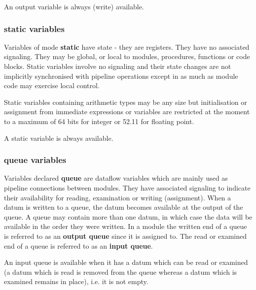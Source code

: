                 An output variable is always (write) available.

            \subsubsection{static variables}

                Variables of mode {\bf static} have state - they are registers.
                They have no associated signaling. They may be global, or local to
                modules, procedures, functions or code blocks. Static
                variables involve no signaling and their state changes are not
                implicitly synchronised with pipeline operations except in as much
                as module code may exercise local control.

                Static variables containing arithmetic types may be any size
                but initialisation or assignment from immediate expressions or
                variables are restricted at the moment to a maximum of 64 bits for
                integer or 52.11 for floating point.

                A static variable is always available.

            \subsubsection{queue variables}

                Variables declared {\bf queue} are dataflow variables which are
                mainly used as pipeline connections between modules. They have
                associated signaling to indicate their availability for reading,
                examination or writing (assignment). When a datum is written to a
                queue, the datum becomes available at the output of the queue. A
                queue may contain more than one datum, in which case the data will
                be available in the order they were written. In a module the
                written end of a queue is referred to as an {\bf output queue}
                since it is assigned to. The read or examined end of a queue is
                referred to as an {\bf input queue}.

                An input queue is available when it has a datum which can be read
                or examined (a datum which is read is removed from the queue
                whereas a datum which is examined remains in place), i.e. it is
                not empty.

